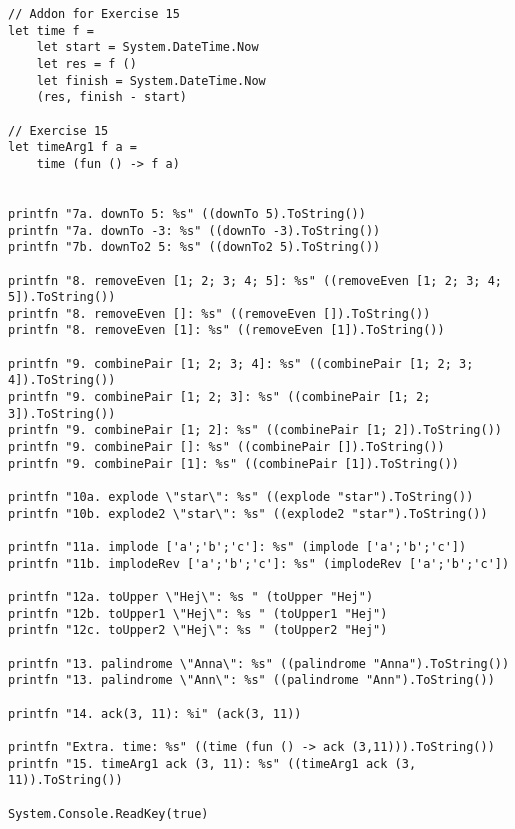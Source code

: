 \begin{lstlisting}
// Addon for Exercise 15
let time f =
    let start = System.DateTime.Now
    let res = f ()
    let finish = System.DateTime.Now
    (res, finish - start)

// Exercise 15
let timeArg1 f a =
    time (fun () -> f a)


printfn "7a. downTo 5: %s" ((downTo 5).ToString())
printfn "7a. downTo -3: %s" ((downTo -3).ToString())
printfn "7b. downTo2 5: %s" ((downTo2 5).ToString())

printfn "8. removeEven [1; 2; 3; 4; 5]: %s" ((removeEven [1; 2; 3; 4; 5]).ToString())
printfn "8. removeEven []: %s" ((removeEven []).ToString())
printfn "8. removeEven [1]: %s" ((removeEven [1]).ToString())

printfn "9. combinePair [1; 2; 3; 4]: %s" ((combinePair [1; 2; 3; 4]).ToString())
printfn "9. combinePair [1; 2; 3]: %s" ((combinePair [1; 2; 3]).ToString())
printfn "9. combinePair [1; 2]: %s" ((combinePair [1; 2]).ToString())
printfn "9. combinePair []: %s" ((combinePair []).ToString())
printfn "9. combinePair [1]: %s" ((combinePair [1]).ToString())

printfn "10a. explode \"star\": %s" ((explode "star").ToString())
printfn "10b. explode2 \"star\": %s" ((explode2 "star").ToString())

printfn "11a. implode ['a';'b';'c']: %s" (implode ['a';'b';'c'])
printfn "11b. implodeRev ['a';'b';'c']: %s" (implodeRev ['a';'b';'c'])

printfn "12a. toUpper \"Hej\": %s " (toUpper "Hej")
printfn "12b. toUpper1 \"Hej\": %s " (toUpper1 "Hej")
printfn "12c. toUpper2 \"Hej\": %s " (toUpper2 "Hej")

printfn "13. palindrome \"Anna\": %s" ((palindrome "Anna").ToString())
printfn "13. palindrome \"Ann\": %s" ((palindrome "Ann").ToString())

printfn "14. ack(3, 11): %i" (ack(3, 11))

printfn "Extra. time: %s" ((time (fun () -> ack (3,11))).ToString())
printfn "15. timeArg1 ack (3, 11): %s" ((timeArg1 ack (3, 11)).ToString())

System.Console.ReadKey(true)
\end{lstlisting}
